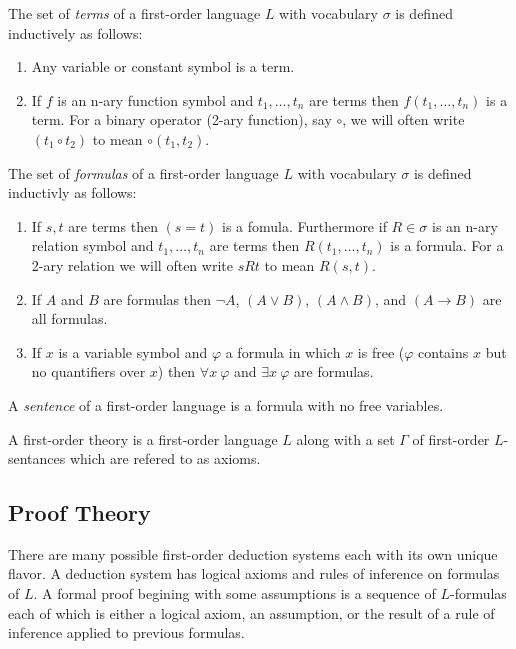 \documentclass[12pt]{article}
\begin{document}
\begin{definition}
The set of \textit{terms} of a first-order language $L$ with vocabulary $\sigma$ is defined inductively as follows:
\begin{enumerate}
\item Any variable or constant symbol is a term.
\item If $f$ is an n-ary function symbol and $t_1, \dots, t_n$ are terms then $f(t_1, \dots, t_n)$ is a term. For a binary operator (2-ary function), say $\circ$, we will often write $(t_1 \circ t_2)$ to mean $\circ(t_1, t_2)$. 
\end{enumerate} 
\end{definition}

\begin{definition}
The set of \textit{formulas} of a first-order language $L$ with vocabulary $\sigma$ is defined inductivly as follows:
\begin{enumerate}
\item If $s,t$ are terms then $(s = t)$ is a fomula. Furthermore if $R \in \sigma$ is an n-ary relation symbol and $t_1, \dots, t_n$ are terms then $R(t_1, \dots, t_n)$ is a formula. For a 2-ary relation we will often write $s R t$ to mean $R(s, t)$. 
\item If $A$ and $B$ are formulas then $\neg A$, $(A \vee B)$, $(A \wedge B)$, and $(A \to B)$ are all formulas.
\item If $x$ is a variable symbol and $\varphi$ a formula in which $x$ is free ($\varphi$ contains $x$ but no quantifiers over $x$) then $\forall x \: \varphi$ and $\exists x \: \varphi$ are formulas. 
\end{enumerate}
\end{definition}

\begin{definition}
A \textit{sentence} of a first-order language is a formula with no free variables.  
\end{definition}

\begin{definition}
A first-order theory is a first-order language $L$ along with a set $\Gamma$ of first-order $L$-sentances which are refered to as axioms. 
\end{definition}

\subsection{Proof Theory}

There are many possible first-order deduction systems each with its own unique flavor. A deduction system has logical axioms and rules of inference on formulas of $L$. A formal proof begining with some assumptions is a sequence of $L$-formulas each of which is either a logical axiom, an assumption, or the result of a rule of inference applied to previous formulas.  
\end{document}
